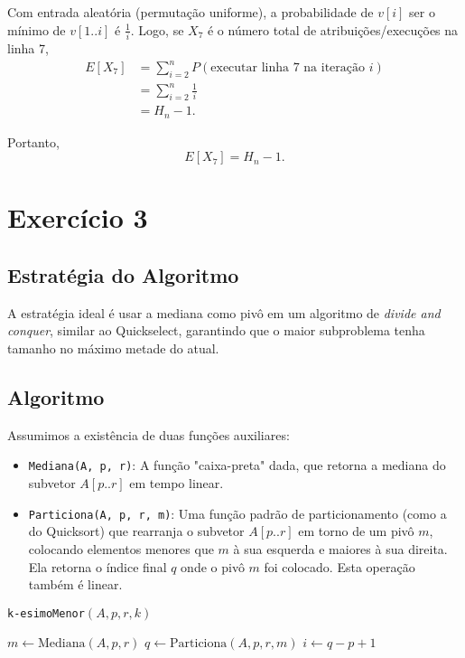\documentclass[a4paper,12pt]{article}
\begin{document}
Com entrada aleatória (permutação uniforme), a probabilidade de $v[i]$ ser o mínimo de $v[1..i]$ é $\tfrac{1}{i}$. Logo, se $X_7$ é o número total de atribuições/execuções na linha 7,
\begin{align}
E[X_7]
&= \sum_{i=2}^{n} P(\text{executar linha 7 na iteração } i) \\
&= \sum_{i=2}^{n} \frac{1}{i} \\
&= H_n - 1.
\end{align}

Portanto,
\begin{equation}
\boxed{E[X_7] = H_n - 1}.
\end{equation}

\section*{Exercício 3}

\subsection*{Estratégia do Algoritmo}
A estratégia ideal é usar a mediana como pivô em um algoritmo de \textit{divide and conquer}, similar ao Quickselect, garantindo que o maior subproblema tenha tamanho no máximo metade do atual.

\subsection*{Algoritmo}

Assumimos a existência de duas funções auxiliares:
\begin{itemize}
    \item \texttt{Mediana(A, p, r)}: A função "caixa-preta" dada, que retorna a mediana do subvetor $A[p..r]$ em tempo linear.
    \item \texttt{Particiona(A, p, r, m)}: Uma função padrão de particionamento (como a do Quicksort) que rearranja o subvetor $A[p..r]$ em torno de um pivô $m$, colocando elementos menores que $m$ à sua esquerda e maiores à sua direita. Ela retorna o índice final $q$ onde o pivô $m$ foi colocado. Esta operação também é linear.
\end{itemize}

\begin{algorithm}[H]
\SetAlgoLined
\caption{\texttt{k-esimoMenor}$(A, p, r, k)$}
\BlankLine
{}
$m \leftarrow \text{Mediana}(A, p, r)$\;
$q \leftarrow \text{Particiona}(A, p, r, m)$\;
$i \leftarrow q - p + 1$ 
\end{algorithm}
\newpage
\end{document}
